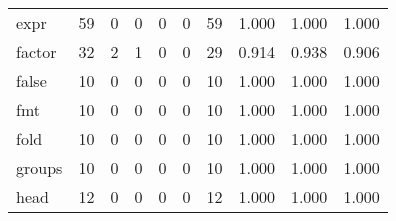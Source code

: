\begin{longtable}{lp{2.0cm}p{2.0cm}p{2.0cm}p{2.0cm}p{2.0cm}p{2.0cm}p{2.0cm}p{2.0cm}p{2.0cm}}
expr      &                     59 &                                             0 &                                            0 &                                           0 &                                            0 &                                         59 &                                1.000 &                                  1.000 &                                1.000 \\
factor    &                     32 &                                             2 &                                            1 &                                           0 &                                            0 &                                         29 &                                0.914 &                                  0.938 &                                0.906 \\
false     &                     10 &                                             0 &                                            0 &                                           0 &                                            0 &                                         10 &                                1.000 &                                  1.000 &                                1.000 \\
fmt       &                     10 &                                             0 &                                            0 &                                           0 &                                            0 &                                         10 &                                1.000 &                                  1.000 &                                1.000 \\
fold      &                     10 &                                             0 &                                            0 &                                           0 &                                            0 &                                         10 &                                1.000 &                                  1.000 &                                1.000 \\
groups    &                     10 &                                             0 &                                            0 &                                           0 &                                            0 &                                         10 &                                1.000 &                                  1.000 &                                1.000 \\
head      &                     12 &                                             0 &                                            0 &                                           0 &                                            0 &                                         12 &                                1.000 &                                  1.000 &                                1.000 \\

\end{longtable}
